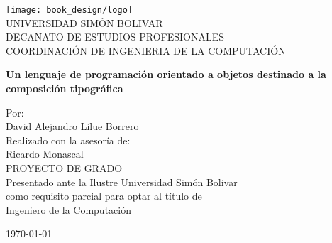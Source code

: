 \documentclass[12pt,letterpaper,titlepage,oneside,openright]{book}
\newcommand{\OhTeX}{%
    \makebox[0.76em][c]{O}%
    \makebox[0.25em][c]{%
        \raisebox{0.14em}[0em][0em]{%
            \fontsize{0.5em}{0cm}%
                \selectfont H%
        }%
    }%
    \makebox[1.35em][c]{\TeX}%
}
\newcommand{\ohtex}{\OhTeX\xspace}
\begin{document}
\frontmatter

\begin{titlepage}
    \begin{center}
        \noindent
        \texttt{[image: book\_design/logo]}\\
        {\large UNIVERSIDAD SIMÓN BOLIVAR}\\
        DECANATO DE ESTUDIOS PROFESIONALES\\
        COORDINACIÓN DE INGENIERIA DE LA COMPUTACIÓN
        
        \vspace{3em}
        \textbf{Un lenguaje de programación orientado a objetos destinado a la composición tipográfica}
        
        
        \vspace{2em}
        Por:\\
        David Alejandro Lilue Borrero\\
        
        \vspace{3em}
        Realizado con la asesoría de:\\
        Ricardo Monascal\\

        \vspace{4em}
        PROYECTO DE GRADO\\
        Presentado ante la Ilustre Universidad Simón Bolivar\\
        como requisito parcial para optar al título de\\
        Ingeniero de la Computación\\
        
        \vfill
        
        \today
        
    \end{center}
\end{titlepage}

\end{document}
